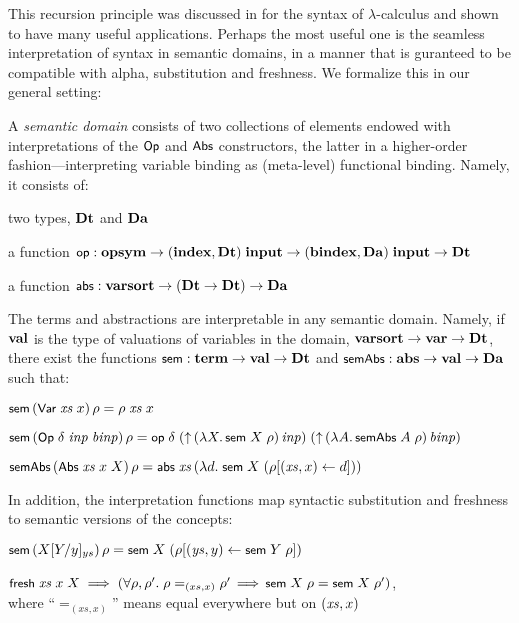 \documentclass{llncs}
\newenvironment{myitem}[1][]
  {\itemize[leftmargin=*,topsep=0.3ex,itemsep=1pt, #1]}
  {\enditemize}
\begin{document}
This recursion principle was discussed in \cite{pop-recPrin} for the %
syntax of $\lambda$-calculus 
and shown to have many useful applications.   
Perhaps the most useful one is the seamless interpretation 
of syntax in semantic domains, in a manner that is guranteed to be 
compatible with alpha, substitution and freshness. We formalize this in our general setting:

A {\em semantic domain} consists of two collections of elements endowed with interpretations 
of the $\mbox{\rm\textsf{\small Op}}$ and $\mbox{\rm\textsf{\small Abs}}$ constructors, the latter 
in a higher-order fashion---interpreting variable binding as (meta-level) functional binding. 
Namely, it consists of:
\begin{myitem}
\item two types, $\bf Dt$ and $\bf Da$ 
\item %
a function $\mbox{\rm\textsf{\small op}} : \mbox{\bf opsym} \rightarrow (\mbox{\bf index},\bf Dt)\;\mbox{\bf input} \rightarrow (\mbox{\bf bindex},\bf Da)\;\mbox{\bf input} \rightarrow \bf Dt$ 
\item %
 a function $\mbox{\rm\textsf{\small abs}} : \mbox{\bf varsort} \rightarrow (\bf Dt \rightarrow \bf Dt) \rightarrow \bf Da$
\end{myitem} 


\begin{thm}\label{th-sem} \rm
The terms and abstractions are %
interpretable in any semantic domain. 
Namely, if $\bf val$ is the type of valuations of %
variables in the domain, 
$\mbox{\bf varsort} \rightarrow \mbox{\bf var} \rightarrow \bf Dt$, 
there exist the functions 
$\mbox{\rm\textsf{\small sem}} : \mbox{\bf term} \rightarrow \bf val \rightarrow \bf Dt$  
and $\mbox{\rm\textsf{\small semAbs}} : \mbox{\bf abs} \rightarrow \bf val \rightarrow \bf Da$ such that:
\begin{myitem}
\item $\mbox{\rm\textsf{\small sem}}\,(\mbox{\rm\textsf{\small Var}}\;\mbox{\textit{xs}}\;x)\,\rho = \rho\;\mbox{\textit{xs}}\;x$
\item $\mbox{\rm\textsf{\small sem}}\,(\mbox{\rm\textsf{\small Op}}\;\delta\;\mbox{\textit{inp}}\;\mbox{\textit{binp}})\,\rho = \mbox{\rm\textsf{\small op}}\;\delta\;
  (\mbox{$\uparrow$}\,(\lambda X.\,\mbox{\rm\textsf{\small sem}}\;X\;\rho)\,\mbox{\textit{inp}})\;(\mbox{$\uparrow$}\,(\lambda A.\,\mbox{\rm\textsf{\small semAbs}}\;A\;\rho)\,\mbox{\textit{binp}})$
\item $\mbox{\rm\textsf{\small semAbs}}\,(\mbox{\rm\textsf{\small Abs}}\;\mbox{\textit{xs}}\;x\;X)\,\rho = \mbox{\rm\textsf{\small abs}}\;\mbox{\textit{xs}}\,(\lambda d.\;\mbox{\rm\textsf{\small sem}}\;X\;(\rho[(\mbox{\textit{xs}},x) \leftarrow d]))$
\end{myitem}
%
\par
In addition, the interpretation functions map syntactic substitution and freshness to semantic versions of the 
concepts: 
\begin{myitem}
\item $\mbox{\rm\textsf{\small sem}}\,(X[Y/y]_{ys})\,\rho = \mbox{\rm\textsf{\small sem}}\;X\;(\rho[(\mbox{\textit{ys}},y) \leftarrow \mbox{\rm\textsf{\small sem}}\;Y\;\rho])$
\item $\mbox{\rm\textsf{\small fresh}}\;\mbox{\textit{xs}}\;x\;X \;\Longrightarrow\;(\forall \rho,\rho'.\;\rho=_{(xs,x)}\rho' \,\Longrightarrow\, \mbox{\rm\textsf{\small sem}}\;X\;\rho = \mbox{\rm\textsf{\small sem}}\;X\;\rho')$,  
\\where ``$=_{(xs,x)}$'' means equal everywhere but on $(\mbox{\textit{xs}},x)$ 
\end{myitem}
\end{thm}
\end{document}
